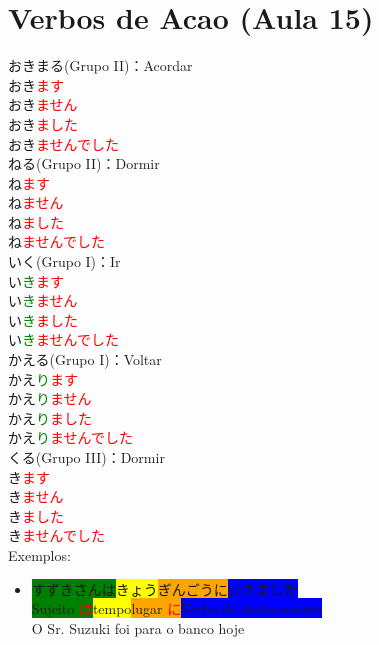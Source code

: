 \documentclass[a4paper, 12pt]{article}
\begin{document}
\section{Verbos de Acao (Aula 15)}
	\begin{CJK}{UTF8}{min}
		\Large
		おきまる(Grupo II)：Acordar\\
		\normalsize
		おき\textcolor{red}{ます}\\
		おき\textcolor{red}{ません}\\
		おき\textcolor{red}{ました}\\
		おき\textcolor{red}{ませんでした}\\

		\Large
		ねる(Grupo II)：Dormir\\
		\normalsize
		ね\textcolor{red}{ます}\\
		ね\textcolor{red}{ません}\\
		ね\textcolor{red}{ました}\\
		ね\textcolor{red}{ませんでした}\\
		
		\Large
		いく(Grupo I)：Ir\\
		\normalsize
		い\textcolor{green}{き}\textcolor{red}{ます}\\
		い\textcolor{green}{き}\textcolor{red}{ません}\\
		い\textcolor{green}{き}\textcolor{red}{ました}\\
		い\textcolor{green}{き}\textcolor{red}{ませんでした}\\
		
		\Large
		かえる(Grupo I)：Voltar\\
		\normalsize
		かえ\textcolor{green}{り}\textcolor{red}{ます}\\
		かえ\textcolor{green}{り}\textcolor{red}{ません}\\
		かえ\textcolor{green}{り}\textcolor{red}{ました}\\
		かえ\textcolor{green}{り}\textcolor{red}{ませんでした}\\
		
		\Large
		くる(Grupo III)：Dormir\\
		\normalsize
		き\textcolor{red}{ます}\\
		き\textcolor{red}{ません}\\
		き\textcolor{red}{ました}\\
		き\textcolor{red}{ませんでした}\\
		
		\Large
		Exemplos:\normalsize
		\begin{itemize}
			\item \colorbox{green}{すずきさんは}\colorbox{yellow}{きょう}\colorbox{orange}{ぎんごうに}\colorbox{blue}{いきました}\\
			\colorbox{green}{Sujeito \textcolor{red}{は}}\colorbox{yellow}{tempo}\colorbox{orange}{lugar \textcolor{red}{に}}\colorbox{blue}{Verbo de deslocamento}\\
			O Sr. Suzuki foi para o banco hoje
			

\end{itemize}
\end{CJK}
\end{document}
